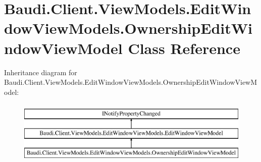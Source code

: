 \hypertarget{class_baudi_1_1_client_1_1_view_models_1_1_edit_window_view_models_1_1_ownership_edit_window_view_model}{}\section{Baudi.\+Client.\+View\+Models.\+Edit\+Window\+View\+Models.\+Ownership\+Edit\+Window\+View\+Model Class Reference}
\label{class_baudi_1_1_client_1_1_view_models_1_1_edit_window_view_models_1_1_ownership_edit_window_view_model}
Inheritance diagram for Baudi.\+Client.\+View\+Models.\+Edit\+Window\+View\+Models.\+Ownership\+Edit\+Window\+View\+Model\+:\begin{figure}[H]
\begin{center}
\leavevmode
\includegraphics[height=3.000000cm]{class_baudi_1_1_client_1_1_view_models_1_1_edit_window_view_models_1_1_ownership_edit_window_view_model}
\end{center}
\end{figure}
